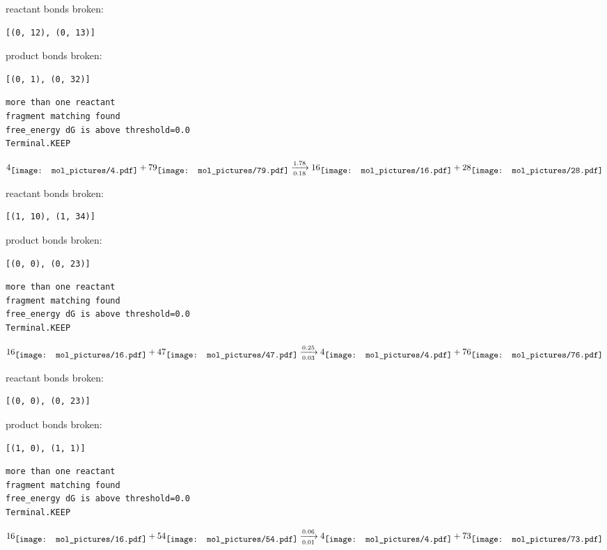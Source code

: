 \documentclass{article}
\begin{document}
reactant bonds broken:\begin{verbatim}
[(0, 12), (0, 13)]
\end{verbatim}
product bonds broken:\begin{verbatim}
[(0, 1), (0, 32)]
\end{verbatim}




\vspace{1cm}
\begin{verbatim}
more than one reactant
fragment matching found
free_energy dG is above threshold=0.0
Terminal.KEEP
\end{verbatim}
$$
4
\raisebox{-.5\height}{\texttt{[image: mol\_pictures/4.pdf]}}
+
79
\raisebox{-.5\height}{\texttt{[image: mol\_pictures/79.pdf]}}
\xrightarrow[0.18]{1.78}
16
\raisebox{-.5\height}{\texttt{[image: mol\_pictures/16.pdf]}}
+
28
\raisebox{-.5\height}{\texttt{[image: mol\_pictures/28.pdf]}}
$$


reactant bonds broken:\begin{verbatim}
[(1, 10), (1, 34)]
\end{verbatim}
product bonds broken:\begin{verbatim}
[(0, 0), (0, 23)]
\end{verbatim}




\vspace{1cm}
\begin{verbatim}
more than one reactant
fragment matching found
free_energy dG is above threshold=0.0
Terminal.KEEP
\end{verbatim}
$$
16
\raisebox{-.5\height}{\texttt{[image: mol\_pictures/16.pdf]}}
+
47
\raisebox{-.5\height}{\texttt{[image: mol\_pictures/47.pdf]}}
\xrightarrow[0.03]{0.25}
4
\raisebox{-.5\height}{\texttt{[image: mol\_pictures/4.pdf]}}
+
76
\raisebox{-.5\height}{\texttt{[image: mol\_pictures/76.pdf]}}
$$


reactant bonds broken:\begin{verbatim}
[(0, 0), (0, 23)]
\end{verbatim}
product bonds broken:\begin{verbatim}
[(1, 0), (1, 1)]
\end{verbatim}




\vspace{1cm}
\begin{verbatim}
more than one reactant
fragment matching found
free_energy dG is above threshold=0.0
Terminal.KEEP
\end{verbatim}
$$
16
\raisebox{-.5\height}{\texttt{[image: mol\_pictures/16.pdf]}}
+
54
\raisebox{-.5\height}{\texttt{[image: mol\_pictures/54.pdf]}}
\xrightarrow[0.01]{0.06}
4
\raisebox{-.5\height}{\texttt{[image: mol\_pictures/4.pdf]}}
+
73
\raisebox{-.5\height}{\texttt{[image: mol\_pictures/73.pdf]}}
$$
\end{document}
